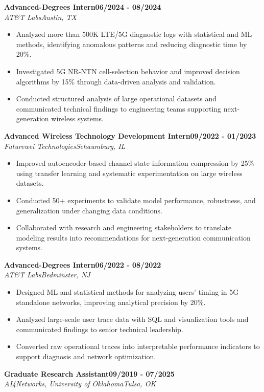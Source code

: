 \documentclass[9pt,letterpaper]{extarticle}
\newcommand{\role}[4]{%
  \Needspace{4\baselineskip}\textbf{#1}\hfill\textbf{#2}\\[-1pt]
  \textit{#3}\hfill\textit{#4}\par}
\begin{document}
\role{Advanced-Degrees Intern}{06/2024 - 08/2024}{AT\&T Labs}{Austin, TX}
\begin{itemize}
\item Analyzed more than 500K LTE/5G diagnostic logs with statistical and ML methods, identifying anomalous patterns and reducing diagnostic time by 20\%.
\item Investigated 5G NR-NTN cell-selection behavior and improved decision algorithms by 15\% through data-driven analysis and validation.
\item Conducted structured analysis of large operational datasets and communicated technical findings to engineering teams supporting next-generation wireless systems.
\end{itemize}
\role{Advanced Wireless Technology Development Intern}{09/2022 - 01/2023}{Futurewei Technologies}{Schaumburg, IL}
\begin{itemize}
\item Improved autoencoder-based channel-state-information compression by 25\% using transfer learning and systematic experimentation on large wireless datasets.
\item Conducted 50+ experiments to validate model performance, robustness, and generalization under changing data conditions.
\item Collaborated with research and engineering stakeholders to translate modeling results into recommendations for next-generation communication systems.
\end{itemize}
\role{Advanced-Degrees Intern}{06/2022 - 08/2022}{AT\&T Labs}{Bedminster, NJ}
\begin{itemize}
\item Designed ML and statistical methods for analyzing users' timing in 5G standalone networks, improving analytical precision by 20\%.
\item Analyzed large-scale user trace data with SQL and visualization tools and communicated findings to senior technical leadership.
\item Converted raw operational traces into interpretable performance indicators to support diagnosis and network optimization.
\end{itemize}
\role{Graduate Research Assistant}{09/2019 - 07/2025}{AI4Networks, University of Oklahoma}{Tulsa, OK}
\end{document}
